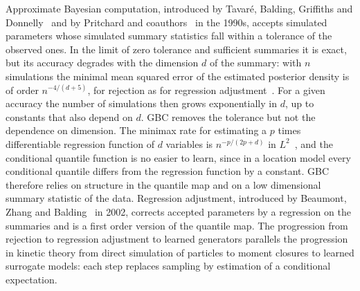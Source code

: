 Approximate Bayesian computation, introduced by Tavar\'e, Balding, Griffiths and Donnelly~\cite{tavare1997} and by Pritchard and coauthors~\cite{pritchard1999} in the 1990s, accepts simulated parameters whose simulated summary statistics fall within a tolerance of the observed ones. In the limit of zero tolerance and sufficient summaries it is exact, but its accuracy degrades with the dimension $d$ of the summary: with $n$ simulations the minimal mean squared error of the estimated posterior density is of order $n^{-4/(d+5)}$, for rejection as for regression adjustment~\cite[Remark~1]{blum2010}. For a given accuracy the number of simulations then grows exponentially in $d$, up to constants that also depend on $d$. GBC removes the tolerance but not the dependence on dimension. The minimax rate for estimating a $p$ times differentiable regression function of $d$ variables is $n^{-p/(2p+d)}$ in $L^2$~\cite{stone1982}, and the conditional quantile function is no easier to learn, since in a location model every conditional quantile differs from the regression function by a constant. GBC therefore relies on structure in the quantile map and on a low dimensional summary statistic of the data. Regression adjustment, introduced by Beaumont, Zhang and Balding~\cite{beaumont2002} in 2002, corrects accepted parameters by a regression on the summaries and is a first order version of the quantile map. The progression from rejection to regression adjustment to learned generators parallels the progression in kinetic theory from direct simulation of particles to moment closures to learned surrogate models: each step replaces sampling by estimation of a conditional expectation.

